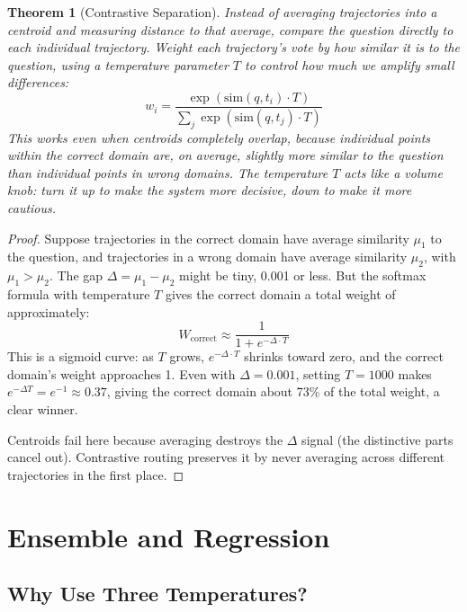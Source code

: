 \documentclass[11pt]{article}
\newtheorem{theorem}{Theorem}[section]
\begin{document}
\begin{theorem}[Contrastive Separation]\label{thm:contrastive}
Instead of averaging trajectories into a centroid and measuring distance
to that average, compare the question directly to each individual trajectory.
Weight each trajectory's vote by how similar it is to the question, using a
temperature parameter $T$ to control how much we amplify small differences:
\begin{equation}
w_i = \frac{\exp(\text{sim}(q, t_i) \cdot T)}{\sum_j \exp(\text{sim}(q, t_j) \cdot T)}
\end{equation}
This works even when centroids completely overlap, because individual points
within the correct domain are, on average, slightly more similar to the
question than individual points in wrong domains. The temperature $T$ acts
like a volume knob: turn it up to make the system more decisive, down to
make it more cautious.
\end{theorem}
\begin{proof}
Suppose trajectories in the correct domain have average similarity $\mu_1$ to
the question, and trajectories in a wrong domain have average similarity
$\mu_2$, with $\mu_1 > \mu_2$. The gap $\Delta = \mu_1 - \mu_2$ might be
tiny, 0.001 or less. But the softmax formula with temperature $T$ gives the
correct domain a total weight of approximately:
\begin{equation}
W_{\text{correct}} \approx \frac{1}{1 + e^{-\Delta \cdot T}}
\end{equation}
This is a sigmoid curve: as $T$ grows, $e^{-\Delta \cdot T}$ shrinks toward
zero, and the correct domain's weight approaches 1. Even with $\Delta =
0.001$, setting $T = 1000$ makes $e^{-\Delta T} = e^{-1} \approx 0.37$,
giving the correct domain about 73\% of the total weight, a clear winner.

Centroids fail here because averaging destroys the $\Delta$ signal (the
distinctive parts cancel out). Contrastive routing preserves it by never
averaging across different trajectories in the first place.
\end{proof}

\newpage
\section{Ensemble and Regression}

\subsection{Why Use Three Temperatures?}
\end{document}
